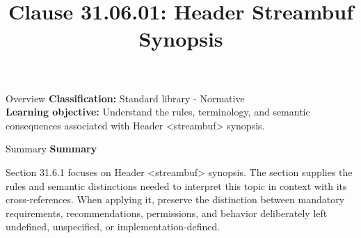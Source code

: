 \documentclass[10pt,letterpaper]{article}
\title{Clause 31.06.01: Header Streambuf Synopsis}
\author{}
\date{}
\begin{document}
\maketitle
\begin{CornellOverviewBox}{Overview}
\textbf{Classification:} Standard library - Normative\\[2pt]
\textbf{Learning objective:} Understand the rules, terminology, and semantic consequences associated with Header <streambuf> synopsis.
\end{CornellOverviewBox}\begin{CornellSummaryBox}{Summary}
{\sffamily\bfseries\color{Accent} Summary}\par\vspace{3pt}Section 31.6.1 focuses on Header <streambuf> synopsis. The section supplies the rules and semantic distinctions needed to interpret this topic in context with its cross-references. When applying it, preserve the distinction between mandatory requirements, recommendations, permissions, and behavior deliberately left undefined, unspecified, or implementation-defined.
\end{CornellSummaryBox}
\end{document}
